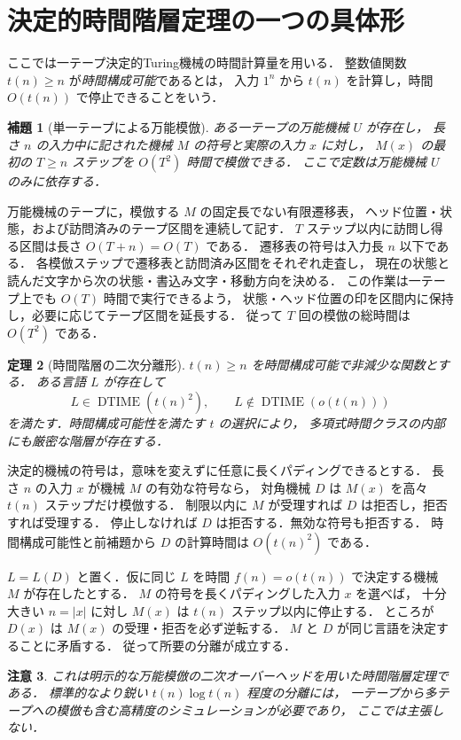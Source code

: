 \documentclass[a5paper,10pt,onecolumn]{jsarticle}
\makeatletter
\theoremstyle{mathnotetheorem}
\newtheorem{theorem}{定理}[section]
\newtheorem{lemma}[theorem]{補題}
\newtheorem{remark}[theorem]{注意}
\renewcommand{\proofname}{証明}
\renewenvironment{proof}[1][\proofname]{%
  \par\pushQED{\qed}\normalfont\topsep4\p@\@plus2\p@\relax
  \trivlist\item[\hskip\labelsep\bfseries #1]\ignorespaces
}{\popQED\endtrivlist\@endpefalse}
\makeatother
\begin{document}
\section{決定的時間階層定理の一つの具体形}
ここでは一テープ決定的Turing機械の時間計算量を用いる．
整数値関数 $t(n)\ge n$ が\emph{時間構成可能}であるとは，
入力 $1^n$ から $t(n)$ を計算し，時間 $O(t(n))$ で停止できることをいう．
\begin{lemma}[単一テープによる万能模倣]
ある一テープの万能機械 $U$ が存在し，
長さ $n$ の入力中に記された機械 $M$ の符号と実際の入力 $x$ に対し，
$M(x)$ の最初の $T\ge n$ ステップを
$O(T^2)$ 時間で模倣できる．
ここで定数は万能機械 $U$ のみに依存する．
\end{lemma}
\begin{proof}
万能機械のテープに，模倣する $M$ の固定長でない有限遷移表，
ヘッド位置・状態，および訪問済みのテープ区間を連続して記す．
$T$ ステップ以内に訪問し得る区間は長さ $O(T+n)=O(T)$ である．
遷移表の符号は入力長 $n$ 以下である．
各模倣ステップで遷移表と訪問済み区間をそれぞれ走査し，
現在の状態と読んだ文字から次の状態・書込み文字・移動方向を決める．
この作業は一テープ上でも $O(T)$ 時間で実行できるよう，
状態・ヘッド位置の印を区間内に保持し，必要に応じてテープ区間を延長する．
従って $T$ 回の模倣の総時間は $O(T^2)$ である．
\end{proof}
\begin{theorem}[時間階層の二次分離形]
$t(n)\ge n$ を時間構成可能で非減少な関数とする．
ある言語 $L$ が存在して
\[
 L\in\operatorname{DTIME}(t(n)^2),\qquad
 L\notin\operatorname{DTIME}(o(t(n)))
\]
を満たす．時間構成可能性を満たす $t$ の選択により，
多項式時間クラスの内部にも厳密な階層が存在する．
\end{theorem}
\begin{proof}
決定的機械の符号は，意味を変えずに任意に長くパディングできるとする．
長さ $n$ の入力 $x$ が機械 $M$ の有効な符号なら，
対角機械 $D$ は $M(x)$ を高々 $t(n)$ ステップだけ模倣する．
制限以内に $M$ が受理すれば $D$ は拒否し，拒否すれば受理する．
停止しなければ $D$ は拒否する．無効な符号も拒否する．
時間構成可能性と前補題から $D$ の計算時間は $O(t(n)^2)$ である．

$L=L(D)$ と置く．仮に同じ $L$ を時間 $f(n)=o(t(n))$
で決定する機械 $M$ が存在したとする．
$M$ の符号を長くパディングした入力 $x$ を選べば，
十分大きい $n=|x|$ に対し $M(x)$ は $t(n)$ ステップ以内に停止する．
ところが $D(x)$ は $M(x)$ の受理・拒否を必ず逆転する．
$M$ と $D$ が同じ言語を決定することに矛盾する．
従って所要の分離が成立する．
\end{proof}
\begin{remark}
これは明示的な万能模倣の二次オーバーヘッドを用いた時間階層定理である．
標準的なより鋭い $t(n)\log t(n)$ 程度の分離には，
一テープから多テープへの模倣も含む高精度のシミュレーションが必要であり，
ここでは主張しない．
\end{remark}
\end{document}
